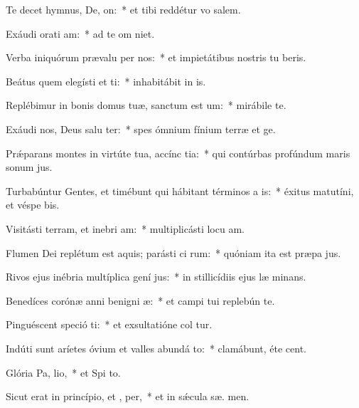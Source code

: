 \item Te decet hymnus, De,  on:~* et tibi reddétur vo  salem.
\item Exáudi orati am:~* ad te om  niet.
\item Verba iniquórum prævalu per nos:~* et impietátibus nostris tu beris.
\item Beátus quem elegísti et ti:~* inhabitábit in  is.
\item Replébimur in bonis domus tuæ, sanctum est  um:~* mirábile  te.
\item Exáudi nos, Deus salu ter:~* spes ómnium fínium terræ et   ge.
\item Prǽparans montes in virtúte tua, accínc tia:~* qui contúrbas profúndum maris sonum  jus.
\item Turbabúntur Gentes, et timébunt qui hábitant términos a  is:~* éxitus matutíni, et véspe bis.
\item Visitásti terram, et inebri am:~* multiplicásti locu am.
\item Flumen Dei replétum est aquis; parásti ci rum:~* quóniam ita est præpa jus.
\item Rivos ejus inébria multíplica gení jus:~* in stillicídiis ejus læ minans.
\item Benedíces corónæ anni benigni æ:~* et campi tui replebún te.
\item Pinguéscent speció ti:~* et exsultatióne col tur.
\item Indúti sunt aríetes óvium et valles abundá to:~* clamábunt, éte  cent.
\item Glória Pa,  lio,~* et Spi to.
\item Sicut erat in princípio, et ,  per,~* et in sǽcula sæ. men.
